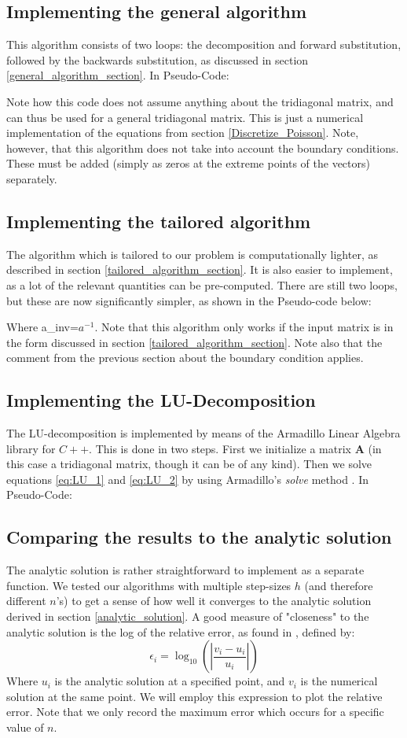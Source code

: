 \documentclass[a4paper, 10pt]{article}
\begin{document}
\subsection{Implementing the general algorithm}
This algorithm consists of two loops: the decomposition and forward substitution, followed by the backwards substitution, as discussed in section \ref{general_algorithm_section}. In Pseudo-Code:

Note how this code does not assume anything about the tridiagonal matrix, and can thus be used for a general tridiagonal matrix. This is just a numerical implementation of the equations from section \ref{Discretize_Poisson}. Note, however, that this algorithm does not take into account the boundary conditions. These must be added (simply as zeros at the extreme points of the vectors) separately. 
\subsection{Implementing the tailored algorithm}
The algorithm which is tailored to our problem is computationally lighter, as described in section \ref{tailored_algorithm_section}. It is also easier to implement, as a lot of the relevant quantities can be pre-computed. There are still two loops, but these are now significantly simpler, as shown in the Pseudo-code below:
 
Where a\_inv=$a^{-1}$. Note that this algorithm only works if the input matrix is in the form discussed in section \ref{tailored_algorithm_section}. Note also that the comment from the previous section about the boundary condition applies.
\newpage
\subsection{Implementing the LU-Decomposition}
The LU-decomposition is implemented by means of the Armadillo Linear Algebra library for $C++$. This is done in two steps. First we initialize a matrix $\mathbf{A}$ (in this case a tridiagonal matrix, though it can be of any kind). Then we solve equations \ref{eq:LU_1} and \ref{eq:LU_2} by using Armadillo's \textit{solve} method . In Pseudo-Code:
 
\subsection{Comparing the results to the analytic solution}\label{compare_error}
The analytic solution is rather straightforward to implement as a separate function. We tested our algorithms with multiple step-sizes $h$ (and therefore different $n$'s) to get a sense of how well it converges to the analytic solution derived in section \ref{analytic_solution}. A good measure of "closeness" to the analytic solution is the log of the relative error, as found in \cite{Morten}, defined by:
\begin{equation}\label{eq:relative_error}
\epsilon_i=\log_{10}\left(\left|\frac{v_i-u_i}{u_i}\right|\right)
\end{equation}
Where $u_i$ is the analytic solution at a specified point, and $v_i$ is the numerical solution at the same point. We will employ this expression to plot the relative error. Note that we only record the maximum error which occurs for a specific value of $n$.
\newpage
\end{document}

